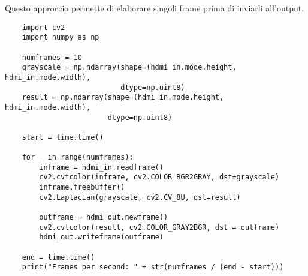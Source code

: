 Questo approccio permette di elaborare singoli frame prima di inviarli all'output.
\vspace{-0.8cm}
\begin{verbatim}
    import cv2
    import numpy as np

    numframes = 10
    grayscale = np.ndarray(shape=(hdmi_in.mode.height, hdmi_in.mode.width),
                           dtype=np.uint8)
    result = np.ndarray(shape=(hdmi_in.mode.height, hdmi_in.mode.width),
                        dtype=np.uint8)

    start = time.time()

    for _ in range(numframes):
        inframe = hdmi_in.readframe()
        cv2.cvtcolor(inframe, cv2.COLOR_BGR2GRAY, dst=grayscale)
        inframe.freebuffer()
        cv2.Laplacian(grayscale, cv2.CV_8U, dst=result)

        outframe = hdmi_out.newframe()
        cv2.cvtcolor(result, cv2.COLOR_GRAY2BGR, dst = outframe)
        hdmi_out.writeframe(outframe)

    end = time.time()
    print("Frames per second: " + str(numframes / (end - start)))
\end{verbatim}










































